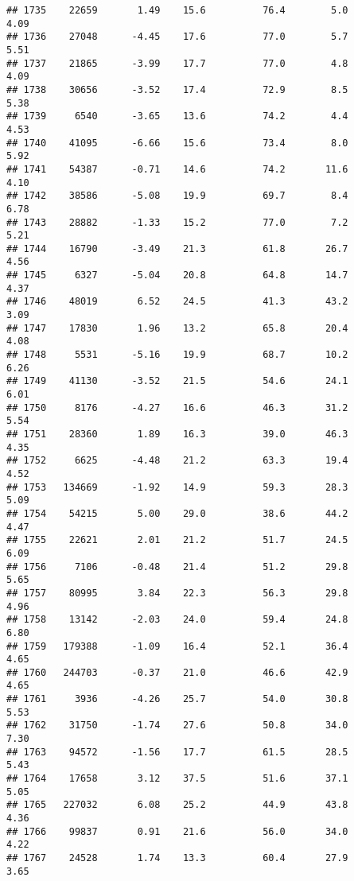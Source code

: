 \documentclass[
]{article}
\begin{document}
\begin{verbatim}
## 1735    22659       1.49    15.6          76.4        5.0              4.09
## 1736    27048      -4.45    17.6          77.0        5.7              5.51
## 1737    21865      -3.99    17.7          77.0        4.8              4.09
## 1738    30656      -3.52    17.4          72.9        8.5              5.38
## 1739     6540      -3.65    13.6          74.2        4.4              4.53
## 1740    41095      -6.66    15.6          73.4        8.0              5.92
## 1741    54387      -0.71    14.6          74.2       11.6              4.10
## 1742    38586      -5.08    19.9          69.7        8.4              6.78
## 1743    28882      -1.33    15.2          77.0        7.2              5.21
## 1744    16790      -3.49    21.3          61.8       26.7              4.56
## 1745     6327      -5.04    20.8          64.8       14.7              4.37
## 1746    48019       6.52    24.5          41.3       43.2              3.09
## 1747    17830       1.96    13.2          65.8       20.4              4.08
## 1748     5531      -5.16    19.9          68.7       10.2              6.26
## 1749    41130      -3.52    21.5          54.6       24.1              6.01
## 1750     8176      -4.27    16.6          46.3       31.2              5.54
## 1751    28360       1.89    16.3          39.0       46.3              4.35
## 1752     6625      -4.48    21.2          63.3       19.4              4.52
## 1753   134669      -1.92    14.9          59.3       28.3              5.09
## 1754    54215       5.00    29.0          38.6       44.2              4.47
## 1755    22621       2.01    21.2          51.7       24.5              6.09
## 1756     7106      -0.48    21.4          51.2       29.8              5.65
## 1757    80995       3.84    22.3          56.3       29.8              4.96
## 1758    13142      -2.03    24.0          59.4       24.8              6.80
## 1759   179388      -1.09    16.4          52.1       36.4              4.65
## 1760   244703      -0.37    21.0          46.6       42.9              4.65
## 1761     3936      -4.26    25.7          54.0       30.8              5.53
## 1762    31750      -1.74    27.6          50.8       34.0              7.30
## 1763    94572      -1.56    17.7          61.5       28.5              5.43
## 1764    17658       3.12    37.5          51.6       37.1              5.05
## 1765   227032       6.08    25.2          44.9       43.8              4.36
## 1766    99837       0.91    21.6          56.0       34.0              4.22
## 1767    24528       1.74    13.3          60.4       27.9              3.65

\end{verbatim}
\end{document}
